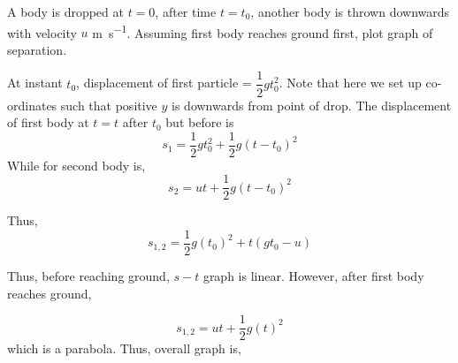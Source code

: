 \begin{example}
    A body is dropped at \(t = 0\), after time \(t = t_0\), another body is thrown downwards with
    velocity \(u\) \si{\meter\per\second}. Assuming first body reaches ground first, plot graph
    of separation.

    \begin{soln}
        At instant \(t_0\), displacement of first particle = \(\dfrac{1}{2}gt_{0}^2\). Note that here
        we set up co-ordinates such that positive \(y\) is downwards from point of drop. The displacement 
        of first body at \(t = t\) after \(t_0\) but before  is
        \begin{equation}
            s_1 = \frac{1}{2}gt_{0}^2 + \frac{1}{2}g(t-t_0)^2
        \end{equation}
        While for second body is,
        \begin{equation}
            s_2 = ut + \frac{1}{2}g(t-t_0)^2
        \end{equation}

        Thus, 
        \begin{equation}
            s_{1,2} = \frac{1}{2}g(t_0)^2 + t(gt_0 - u)
        \end{equation}

        Thus, before reaching ground, \(s-t\) graph is linear. However, after first body reaches ground,

        \begin{equation}
            s_{1,2} = ut + \frac{1}{2}g(t)^2
        \end{equation}
        which is a parabola. Thus, overall graph is,
        \begin{figure}[H]
            \centering
        \end{figure}
    \end{soln}
\end{example}

